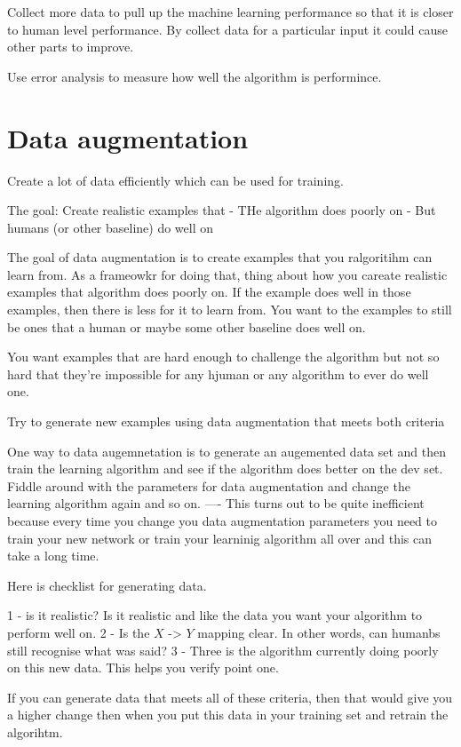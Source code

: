 Collect more data to pull up the machine learning performance so that it is closer to human level performance.
By collect data for a particular input it could cause other parts to improve.

Use error analysis to measure how well the algorithm is performince.

\section{Data augmentation}

Create a lot of data efficiently which can be used for training.

The goal: Create realistic examples that
- THe algorithm does poorly on
- But humans (or other baseline) do well on

The goal of data augmentation is to create examples that you ralgoritihm can learn from.
As a frameowkr for doing that, thing about how you careate realistic examples that algorithm does poorly on.
If the example does well in those examples, then there is less for it to learn from.
You want to the examples to still be ones that a human or maybe some other baseline does well on.

You want examples that are hard enough to challenge the algorithm but not so hard that they're impossible for any hjuman or any algorithm to ever do well one.

Try to generate new examples using data augmentation that meets both criteria

One way to data augemnetation is to generate an augemented data set and then train the learning algorithm and see if the algorithm does better on the dev set.
Fiddle around with the parameters for data augmentation and change the learning algorithm again and so on.
---- This turns out to be quite inefficient because every time you change you data augmentation parameters you need to train your new network or train your learninig algorithm all over and this can take a long time.


Here is checklist for generating data.

1 - is it realistic? Is it realistic and like the data you want your algorithm to perform well on.
2 - Is the $X$ -> $Y$ mapping clear. In other words, can humanbs still recognise what was said?
3 - Three is the algorithm currently doing poorly on this new data. This helps you verify point one.

If you can generate data that meets all of these criteria, then that would give you a higher change then when you put this data in your training set and retrain the algorihtm.


